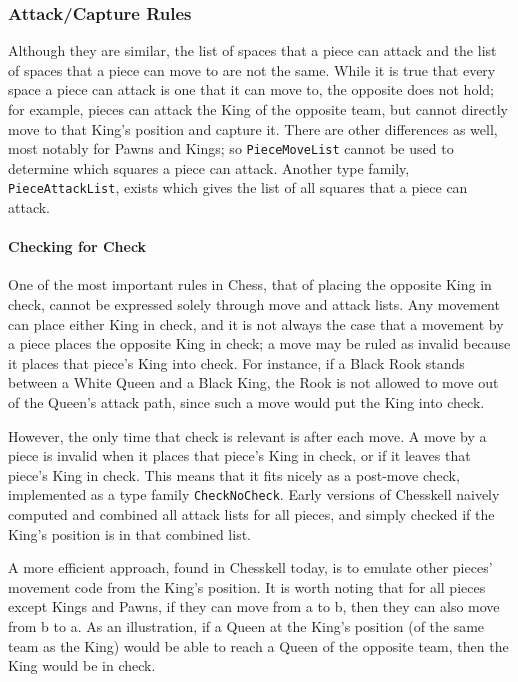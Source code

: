\documentclass[12pt, a4paper, bibliography=totocnumbered]{scrreprt}
\newcommand{\inline}[1]{\lstinline[basicstyle=\ttfamily\footnotesize]{#1}}
\begin{document}
\subsubsection{Attack/Capture Rules}

Although they are similar, the list of spaces that a piece can attack and the list of spaces that a piece can move to are not the same. While it is true that every space a piece can attack is one that it can move to, the opposite does not hold; for example, pieces can attack the King of the opposite team, but cannot directly move to that King's position and capture it. There are other differences as well, most notably for Pawns and Kings; so \inline{PieceMoveList} cannot be used to determine which squares a piece can attack. Another type family, \inline{PieceAttackList}, exists which gives the list of all squares that a piece can attack.

\paragraph{Checking for Check}

One of the most important rules in Chess, that of placing the opposite King in check, cannot be expressed solely through move and attack lists. Any movement can place either King in check, and it is not always the case that a movement by a piece places the opposite King in check; a move may be ruled as invalid because it places that piece's King into check. For instance, if a Black Rook stands between a White Queen and a Black King, the Rook is not allowed to move out of the Queen's attack path, since such a move would put the King into check.

However, the only time that check is relevant is after each move. A move by a piece is invalid when it places that piece's King in check, or if it leaves that piece's King in check. This means that it fits nicely as a post-move check, implemented as a type family \inline{CheckNoCheck}. Early versions of Chesskell naively computed and combined all attack lists for all pieces, and simply checked if the King's position is in that combined list.

A more efficient approach, found in Chesskell today, is to emulate other pieces' movement code from the King's position. It is worth noting that for all pieces except Kings and Pawns, if they can move from a to b, then they can also move from b to a. As an illustration, if a Queen at the King's position (of the same team as the King) would be able to reach a Queen of the opposite team, then the King would be in check.
\end{document}
